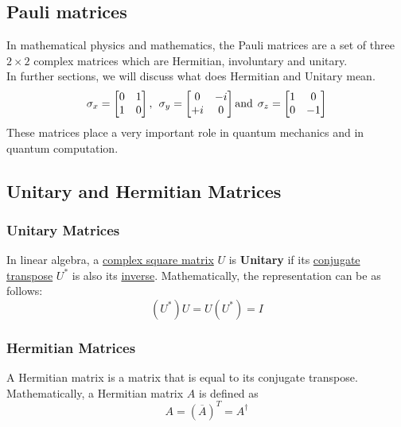 \documentclass{article}
\begin{document}
\subsection{Pauli matrices}
\label{subsec:Pauli matrices}
In mathematical physics and mathematics, the Pauli matrices are a set of three $2\times2$ complex matrices which are Hermitian, involuntary and unitary.\\
In further sections, we will discuss what does Hermitian and Unitary mean.
\begin{equation}
    \sigma_{x} = \begin{bmatrix}
        0 & 1 \\ 1 & 0
    \end{bmatrix},\hspace{0.15cm} 
    \sigma_{y} = \begin{bmatrix}
        0 & -i \\ +i & 0
    \end{bmatrix} \text{and} \hspace{0.15cm}
    \sigma_{z} = \begin{bmatrix}
        1 & 0 \\ 0 & -1
    \end{bmatrix}
\end{equation}
These matrices place a very important role in quantum mechanics and in quantum computation.

\subsection{Unitary and Hermitian Matrices}
\label{subsec:Unitary Matrices}

\subsubsection{Unitary Matrices}
\label{subsubsec: Unitary matrices}
In linear algebra, a \underline{complex square matrix} $U$ is \textbf{Unitary} if its \underline{conjugate transpose} $U^{*}$ is also its \underline{inverse}. Mathematically, the representation can be as follows:
\begin{equation}
    (U^{*})U = U(U^{*}) = I
\end{equation}

\subsubsection{Hermitian Matrices}
A Hermitian matrix is a matrix that is equal to its conjugate transpose. Mathematically, a Hermitian matrix $A$ is defined as 
\begin{equation}
    A = (\overline{A})^{T} = A^{\dagger}
\end{equation}
\end{document}
